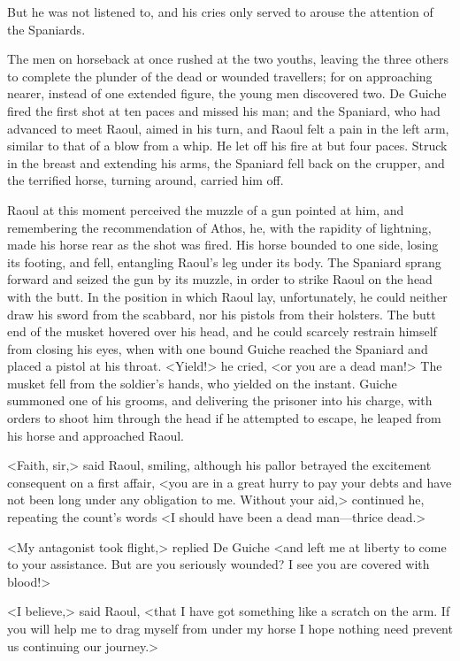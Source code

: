 But he was not listened to, and his cries only served to arouse the attention of the Spaniards.

The men on horseback at once rushed at the two youths, leaving the three others to complete the plunder of the dead or wounded travellers; for on approaching nearer, instead of one extended figure, the young men discovered two. De Guiche fired the first shot at ten paces and missed his man; and the Spaniard, who had advanced to meet Raoul, aimed in his turn, and Raoul felt a pain in the left arm, similar to that of a blow from a whip. He let off his fire at but four paces. Struck in the breast and extending his arms, the Spaniard fell back on the crupper, and the terrified horse, turning around, carried him off.

Raoul at this moment perceived the muzzle of a gun pointed at him, and remembering the recommendation of Athos, he, with the rapidity of lightning, made his horse rear as the shot was fired. His horse bounded to one side, losing its footing, and fell, entangling Raoul's leg under its body. The Spaniard sprang forward and seized the gun by its muzzle, in order to strike Raoul on the head with the butt. In the position in which Raoul lay, unfortunately, he could neither draw his sword from the scabbard, nor his pistols from their holsters. The butt end of the musket hovered over his head, and he could scarcely restrain himself from closing his eyes, when with one bound Guiche reached the Spaniard and placed a pistol at his throat. <Yield!> he cried, <or you are a dead man!> The musket fell from the soldier's hands, who yielded on the instant. Guiche summoned one of his grooms, and delivering the prisoner into his charge, with orders to shoot him through the head if he attempted to escape, he leaped from his horse and approached Raoul.

<Faith, sir,> said Raoul, smiling, although his pallor betrayed the excitement consequent on a first affair, <you are in a great hurry to pay your debts and have not been long under any obligation to me. Without your aid,> continued he, repeating the count's words <I should have been a dead man—thrice dead.>

<My antagonist took flight,> replied De Guiche <and left me at liberty to come to your assistance. But are you seriously wounded? I see you are covered with blood!>

<I believe,> said Raoul, <that I have got something like a scratch on the arm. If you will help me to drag myself from under my horse I hope nothing need prevent us continuing our journey.>

